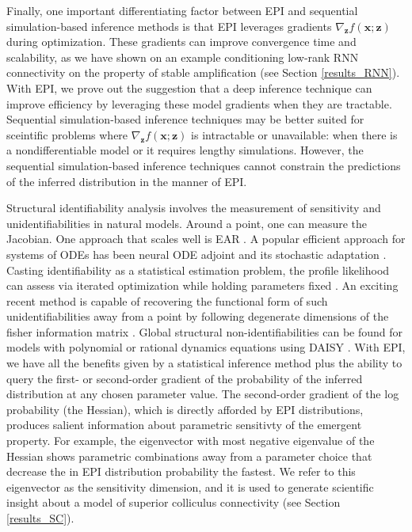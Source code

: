 \documentclass[11pt]{article}
\begin{document}
Finally, one important differentiating factor between EPI and sequential simulation-based inference methods is that EPI leverages gradients $\nabla_{\mathbf{z}} f(\mathbf{x}; \mathbf{z})$ during optimization.
These gradients can improve convergence time and scalability, as we have shown on an example conditioning low-rank RNN connectivity on the property of stable amplification (see Section \ref{results_RNN}).
With EPI, we prove out the suggestion that a deep inference technique can improve efficiency by leveraging these model gradients when they are tractable.
Sequential simulation-based inference techniques may be better suited for sceintific problems where $\nabla_{\mathbf{z}} f(\mathbf{x}; \mathbf{z})$ is intractable or unavailable: when there is a nondifferentiable model or it requires lengthy simulations.
However, the sequential simulation-based inference techniques cannot constrain the predictions of the inferred distribution in the manner of EPI.

Structural identifiability analysis involves the measurement of sensitivity and unidentifiabilities in natural models.
Around a point, one can measure the Jacobian. One approach that scales well is EAR \cite{karlsson2012efficient}.
A popular efficient approach for systems of ODEs has been neural ODE adjoint \cite{chen2018neural} and its stochastic adaptation \cite{li2020scalable}.
Casting identifiability as a statistical estimation problem, the profile likelihood can assess via iterated optimization while holding parameters fixed \cite{raue2009structural}.
An exciting recent method is capable of recovering the functional form of such unidentifiabilities away from a point by following degenerate dimensions of the fisher information matrix \cite{raman2017delineating}.
Global structural non-identifiabilities can be found for models with polynomial or rational dynamics equations using DAISY \cite{saccomani2003parameter}.
With EPI, we have all the benefits given by a statistical inference method plus the ability to query the first- or second-order gradient of the probability of the inferred distribution at any chosen parameter value.
The second-order gradient of the log probability (the Hessian), which is directly afforded by EPI distributions, produces salient information about parametric sensitivty of the emergent property.
For example, the eigenvector with most negative eigenvalue of the Hessian shows parametric combinations away from a parameter choice that decrease the in EPI distribution probability the fastest.
We refer to this eigenvector as the sensitivity dimension, and it is used to generate scientific insight about a model of superior colliculus connectivity (see Section \ref{results_SC}). 
\end{document}
